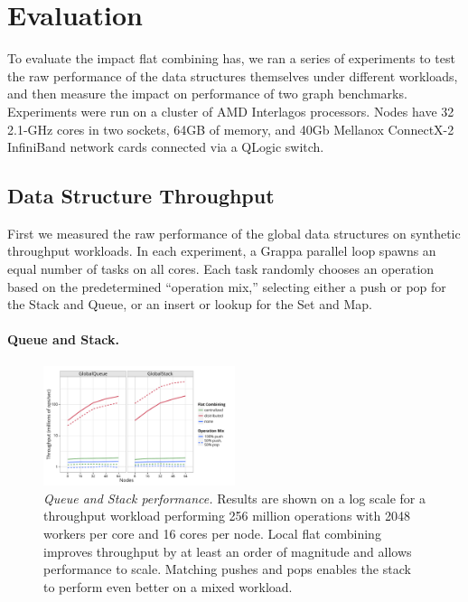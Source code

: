\section{Evaluation}
To evaluate the impact flat combining has, we ran a series of experiments to test the raw performance of the data structures themselves under different workloads, and then measure the impact on performance of two graph benchmarks.
Experiments were run on a cluster of AMD Interlagos processors. Nodes have 32 2.1-GHz cores in two sockets, 64GB of memory, and 40Gb Mellanox ConnectX-2 InfiniBand network cards connected via a QLogic switch.

\subsection{Data Structure Throughput}
First we measured the raw performance of the global data structures on synthetic throughput workloads. In each experiment, a Grappa parallel loop spawns an equal number of tasks on all cores. Each task randomly chooses an operation based on the predetermined ``operation mix,'' selecting either a push or pop for the Stack and Queue, or an insert or lookup for the Set and Map.

\paragraph{Queue and Stack.}
\begin{figure}[t]
  \centering
  \includegraphics[width=0.5\textwidth]{data/plots/vector_perf.pdf}
  \caption{\emph{Queue and Stack performance.}
    Results are shown on a log scale for a throughput workload performing 256 million operations with 2048 workers per core and 16 cores per node. Local flat combining improves throughput by at least an order of magnitude and allows performance to scale. Matching pushes and pops enables the stack to perform even better on a mixed workload.
  }
  \label{fig:vector}
\end{figure}

